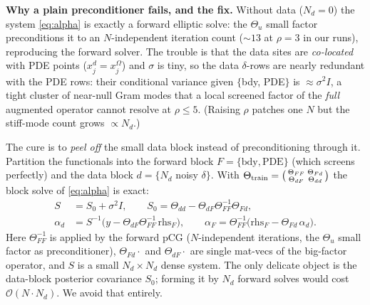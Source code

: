 \documentclass[11pt]{article}
\newcommand{\inv}{^{-1}}
\newcommand{\Th}{\Theta}
\newcommand{\Thtr}{\Th_{\mathrm{train}}}
\newcommand{\bigO}{\mathcal{O}}
\begin{document}
\textbf{Why a plain preconditioner fails, and the fix.} Without data
($N_d=0$) the system \eqref{eq:alpha} is exactly a forward elliptic solve: the
$\Th_u$ small factor preconditions it to an $N$-independent iteration count
($\sim 13$ at $\rho=3$ in our runs), reproducing the forward solver. The trouble
is that the data sites are \emph{co-located} with PDE points
($x_j^d=x_j^\Omega$) and $\sigma$ is tiny, so the data $\delta$-rows are nearly
redundant with the PDE rows: their conditional variance given $\{$bdy,
PDE$\}$ is $\approx\sigma^2 I$, a tight cluster of near-null Gram modes that a
local screened factor of the \emph{full} augmented operator cannot resolve at
$\rho\le 5$. (Raising $\rho$ patches one $N$ but the stiff-mode count grows
$\propto N_d$.)

The cure is to \emph{peel off} the small data block instead of preconditioning
through it. Partition the functionals into the forward block
$F=\{\text{bdy},\text{PDE}\}$ (which screens perfectly) and the data block
$d=\{N_d$ noisy $\delta\}$. With
$\Thtr=\begin{psmallmatrix}\Th_{FF}&\Th_{Fd}\\ \Th_{dF}&\Th_{dd}\end{psmallmatrix}$
the block solve of \eqref{eq:alpha} is exact:
\begin{equation}\label{eq:bordered}
\begin{aligned}
S &= S_0 + \sigma^2 I,\qquad S_0 = \Th_{dd} - \Th_{dF}\Th_{FF}\inv\Th_{Fd},\\
\alpha_d &= S\inv\bigl(y - \Th_{dF}\Th_{FF}\inv\, \text{rhs}_F\bigr),\qquad
\alpha_F = \Th_{FF}\inv\bigl(\text{rhs}_F - \Th_{Fd}\,\alpha_d\bigr).
\end{aligned}
\end{equation}
Here $\Th_{FF}\inv$ is applied by the forward pCG ($N$-independent iterations,
the $\Th_u$ small factor as preconditioner), $\Th_{Fd}\cdot$ and
$\Th_{dF}\cdot$ are single mat-vecs of the big-factor operator, and $S$ is a
small $N_d\times N_d$ dense system. The only delicate object is the data-block
posterior covariance $S_0$; forming it by $N_d$ forward solves would cost
$\bigO(N\cdot N_d)$. We avoid that entirely.
\end{document}
